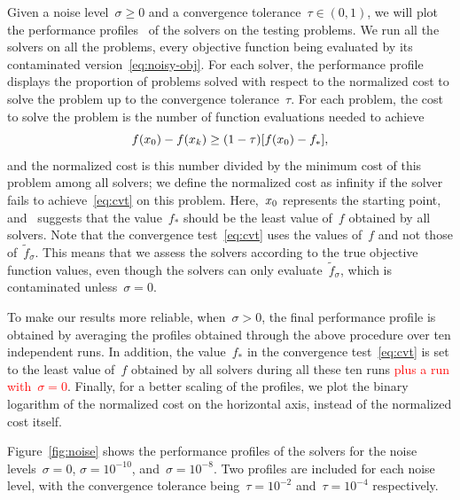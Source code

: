 \documentclass[
    smallextended,  %
    final,          %
]{svjour3}
\newcommand{\iter}[1][k]{x\ifthenelse{\equal{#1}{}}{}{_{#1}}}
\newcommand{\obj}{f}
\newcommand{\red}{\textcolor{red}}
\begin{document}
Given a noise level~$\sigma\ge 0$ and a convergence tolerance~$\tau\in(0,1)$, we will plot the
performance profiles~\cite{More_Wild_2009} of the solvers on the testing problems.
We run all the solvers on all the problems, every objective function being evaluated by its
contaminated version~\eqref{eq:noisy-obj}.
For each solver, the performance profile displays the proportion of problems solved with respect to the
normalized cost to solve the problem up to the convergence tolerance~$\tau$.
For each problem, the cost to solve the problem is the number of function evaluations needed to achieve
\begin{equation}
    \label{eq:cvt}
    \obj(\iter[0]) - \obj(\iter) \ge (1 - \tau) [\obj(\iter[0]) - \obj_{\ast}],
\end{equation}
and the normalized cost is this number divided by the minimum cost of this problem among all solvers;
we define the normalized cost as infinity if the solver fails to achieve~\eqref{eq:cvt} on this problem.
Here,~$\iter[0]$ represents the starting point, and~\cite[\S~2.1]{More_Wild_2009} suggests that the value~$\obj_{\ast}$ should be the least value of~$\obj$ obtained by all solvers.
Note that the convergence test~\eqref{eq:cvt} uses the values of~$\obj$ and not
those of~$\tilde{\obj}_\sigma$.
This means that we assess the solvers according to the true objective function values, even though the
solvers can only evaluate~$\tilde{\obj}_\sigma$, which is contaminated unless~$\sigma = 0$.

To make our results more reliable, when~$\sigma>0$, the final performance profile is obtained by
averaging the profiles obtained through the above procedure over ten independent runs. In addition, the
value~$\obj_{\ast}$ in the convergence test~\eqref{eq:cvt} is set to the least value of~$\obj$ obtained
by all solvers during all these ten runs \red{{plus a run with~$\sigma = 0$}}.
Finally, for a better scaling of the profiles, we plot the binary logarithm of the normalized cost
on the horizontal axis, instead of the normalized cost itself.

Figure~\ref{fig:noise} shows the performance profiles of the solvers for the noise levels~$\sigma = 0$, $\sigma = 10^{-10}$,  and~$\sigma = 10^{-8}$.
Two profiles are included for each noise level, with the convergence tolerance being~$\tau = 10^{-2}$ and~$\tau = 10^{-4}$ respectively.
\end{document}

